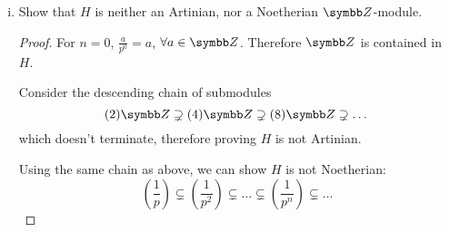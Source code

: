 \begin{problem}
\begin{enumerate}[(i)]
\begin{proof}
    As a counterexample for Noetherianity, consider the ascending chain of submodules
    \[
        \left(\widehat{\frac{1}{p}}\right) \subsetneq \left(\widehat{\frac{1}{p^2}}\right) \subsetneq \dots \subsetneq \left(\widehat{\frac{1}{p^n}}\right) \subsetneq \dots
    \]
    which doesn't stabilize.
    \end{proof}
    
    \item Show that \(H\) is neither an Artinian, nor a Noetherian \(\integers\)-module.
    \begin{proof}
    For \(n = 0\), \(\frac{a}{p^0} = a\), \(\forall a \in \integers\). Therefore \(\integers\) is contained in \(H\).
    
    Consider the descending chain of submodules
    \[
        (2)\integers \supsetneq (4)\integers \supsetneq (8)\integers \supsetneq \dots
    \]
    which doesn't terminate, therefore proving \(H\) is not Artinian.
    
    Using the same chain as above, we can show \(H\) is not Noetherian:
    \[
        \left(\frac{1}{p}\right) \subsetneq \left(\frac{1}{p^2}\right) \subsetneq \dots \subsetneq \left(\frac{1}{p^n}\right) \subsetneq \dots
    \]
    \end{proof}
\end{enumerate}
\end{problem}

